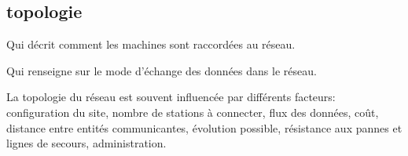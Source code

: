 \documentclass[a4paper, 9pt]{article}
\begin{document}
        \subsection{topologie}
            \begin{description}[style=nextline]
                \item[topologie physique:]
                Qui décrit comment les machines sont raccordées au réseau.

                \item[topologie logique:]
                Qui renseigne sur le mode d'échange des données dans le réseau.
            \end{description}

            La topologie du réseau est souvent influencée par différents facteurs:\\
            configuration du site, nombre de stations à connecter, flux des
            données, coût, distance entre entités communicantes, évolution
            possible, résistance aux pannes et lignes de secours, administration.
\end{document}
